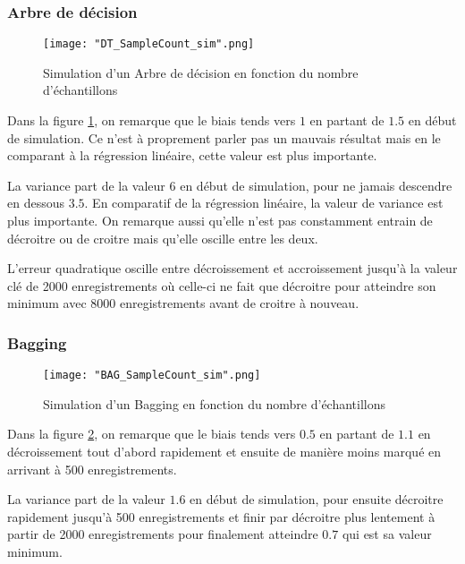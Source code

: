 \documentclass[a4paper]{article}
\begin{document}
\newpage

\subsubsection{Arbre de décision}

\begin{figure}[!h]
	\centering
	\texttt{[image: "DT\_SampleCount\_sim".png]}
	\caption{Simulation d'un Arbre de décision en fonction du nombre d'échantillons}
	\label{DT_SampleCount}
\end{figure}

Dans la figure \ref{DT_SampleCount}, on remarque que le biais tends vers $1$ en partant de $1.5$ en début de simulation. Ce n'est à proprement parler pas un mauvais résultat mais en le comparant à la régression linéaire, cette valeur est plus importante. \newline

La variance part de la valeur $6$ en début de simulation, pour ne jamais descendre en dessous $3.5$. En comparatif de la régression linéaire, la valeur de variance est plus importante. On remarque aussi qu'elle n'est pas constamment entrain de décroitre ou de croitre mais qu'elle oscille entre les deux. \newline

L'erreur quadratique oscille entre décroissement et accroissement jusqu'à la valeur clé de 2000 enregistrements où celle-ci ne fait que décroitre pour atteindre son minimum avec 8000 enregistrements avant de croitre à nouveau.

\newpage

\subsubsection{Bagging}

\begin{figure}[!h]
	\centering
	\texttt{[image: "BAG\_SampleCount\_sim".png]}
	\caption{Simulation d'un Bagging en fonction du nombre d'échantillons}
	\label{BAG_SampleCount}
\end{figure}

Dans la figure \ref{BAG_SampleCount}, on remarque que le biais tends vers $0.5$ en partant de $1.1$ en décroissement tout d'abord rapidement et ensuite de manière moins marqué en arrivant à 500 enregistrements. \newline

La variance part de la valeur $1.6$ en début de simulation, pour ensuite décroitre rapidement jusqu'à 500 enregistrements et finir par décroitre plus lentement à partir de 2000 enregistrements pour finalement atteindre $0.7$ qui est sa valeur minimum. \newline
\end{document}
